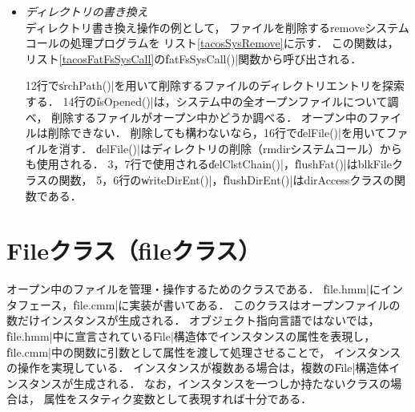 \begin{itemize}
\item \emph{ディレクトリの書き換え} \\
  ディレクトリ書き換え操作の例として，
  ファイルを削除するremoveシステムコールの処理プログラムを
  リスト\ref{tacosSysRemove}に示す．
  この関数は，
  リスト\ref{tacosFatFsSysCall}の\|fatFsSysCall()|関数から呼び出される．

  12行で\|srchPath()|を用いて削除するファイルのディレクトリエントリを探索する．
  14行の\|isOpened()|は，システム中の全オープンファイルについて調べ，
  削除するファイルがオープン中かどうか調べる．
  オープン中のファイルは削除できない．
  削除しても構わないなら，16行で\|delFile()|を用いてファイルを消す．
  \|delFile()|はディレクトリの削除（rmdirシステムコール）からも使用される．
  3，7行で使用される\|delClstChain()|，\|flushFat()|はblkFileクラスの関数，
  5，6行の\|writeDirEnt()|，\|flushDirEnt()|はdirAccessクラスの関数である．

  

\end{itemize}

\section{Fileクラス（fileクラス）}
オープン中のファイルを管理・操作するためのクラスである．
\|file.hmm|にインタフェース，\|file.cmm|に実装が書いてある．
このクラスはオープンファイルの数だけインスタンスが生成される．
オブジェクト指向言語ではない{\cmm}では，
\|file.hmm|中に宣言されている\|File|構造体でインスタンスの属性を表現し，
\|file.cmm|中の関数に引数として属性を渡して処理させることで，
インスタンスの操作を実現している．
インスタンスが複数ある場合は，複数の\|File|構造体インスタンスが生成される．
なお，インスタンスを一つしか持たないクラスの場合は，
属性をスタティク変数として表現すれば十分である．

